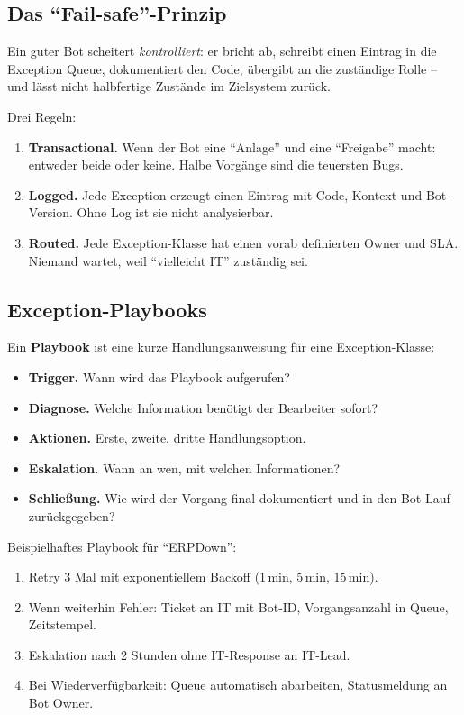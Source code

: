 \documentclass[11pt,a4paper,oneside]{article}
\newcommand{\fachbegriff}[1]{\textbf{#1}}
\begin{document}
\subsection{Das ``Fail-safe''-Prinzip}

Ein guter Bot scheitert \emph{kontrolliert}: er bricht ab, schreibt einen Eintrag in die Exception Queue, dokumentiert den Code, übergibt an die zuständige Rolle -- und lässt nicht halbfertige Zustände im Zielsystem zurück.

Drei Regeln:

\begin{enumerate}
  \item \textbf{Transactional.} Wenn der Bot eine ``Anlage'' und eine ``Freigabe'' macht: entweder beide oder keine. Halbe Vorgänge sind die teuersten Bugs.
  \item \textbf{Logged.} Jede Exception erzeugt einen Eintrag mit Code, Kontext und Bot-Version. Ohne Log ist sie nicht analysierbar.
  \item \textbf{Routed.} Jede Exception-Klasse hat einen vorab definierten Owner und SLA. Niemand wartet, weil ``vielleicht IT'' zuständig sei.
\end{enumerate}

\subsection{Exception-Playbooks}

Ein \fachbegriff{Playbook} ist eine kurze Handlungsanweisung für eine Exception-Klasse:

\begin{itemize}
  \item \textbf{Trigger.} Wann wird das Playbook aufgerufen?
  \item \textbf{Diagnose.} Welche Information benötigt der Bearbeiter sofort?
  \item \textbf{Aktionen.} Erste, zweite, dritte Handlungsoption.
  \item \textbf{Eskalation.} Wann an wen, mit welchen Informationen?
  \item \textbf{Schließung.} Wie wird der Vorgang final dokumentiert und in den Bot-Lauf zurückgegeben?
\end{itemize}

Beispielhaftes Playbook für ``ERPDown'':

\begin{enumerate}
  \item Retry 3 Mal mit exponentiellem Backoff (1\,min, 5\,min, 15\,min).
  \item Wenn weiterhin Fehler: Ticket an IT mit Bot-ID, Vorgangsanzahl in Queue, Zeitstempel.
  \item Eskalation nach 2 Stunden ohne IT-Response an IT-Lead.
  \item Bei Wiederverfügbarkeit: Queue automatisch abarbeiten, Statusmeldung an Bot Owner.
\end{enumerate}
\end{document}
